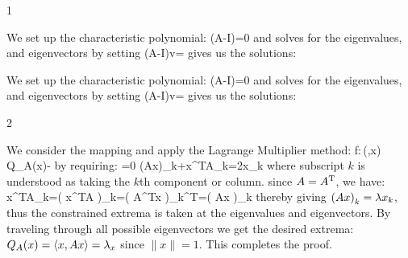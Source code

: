 


\begin{vv286_ms}{1}
\item[(i)]
We set up the characteristic polynomial:
\eq
{
\det(A-\lam I)=0
}
and solves for the eigenvalues, and eigenvectors by setting
\eq
{
(A-\lam I)v=\lam
}
gives us the solutions:

\item[(ii)]
We set up the characteristic polynomial:
\eq
{
\det(A-\lam I)=0
}
and solves for the eigenvalues, and eigenvectors by setting
\eq
{
(A-\lam I)v=\lam
}
gives us the solutions:
\end{vv286_ms}
\begin{vv286_ms}{2}
\item[]
	We consider the mapping and apply the Lagrange Multiplier method:
	\eq
	{
	f:\,(\lam,x)\mapsto\,Q_A(x)-\lam{}
	}
	by requiring:
	\eq
	{
	=0\implies
	(Ax)_k+x^{\rm T}A_k=2\lam x_k
	}
	where subscript $k$ is understood as taking the $k$th component or column.
	since $A=A^{\rm T}$, we have:
	\eq
	{
	x^{\rm T}A_k=\left( x^{\rm T}A \right)_k=\left( A^{\rm T}x \right)_k^{\rm T}=\left(
	Ax \right)_k
	}
	thereby giving $\left( A x \right)_k=\lambda x_k$, thus the constrained extrema is
	taken at the eigenvalues and eigenvectors. By traveling through all possible
	eigenvectors we get the desired extrema: $Q_A(x)=\left\langle x,Ax\right\rangle=\lambda_x$ since
	$\|x\|=1$. This completes the proof.
\end{vv286_ms}
